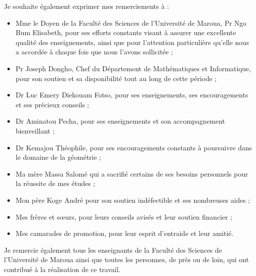 \documentclass[a4paper, 14pt]{report}
\newcommand{\applyfontsize}{%
	\fontsize{12}{12}\selectfont
}
\begin{document}
\begin{onehalfspace}
{			Je souhaite également exprimer mes remerciements à :
			\begin{itemize}
				\item Mme le Doyen de la Faculté des Sciences de l’Université de Maroua, Pr Ngo Bum Elisabeth, pour ses efforts constants visant à assurer une excellente qualité des enseignements, ainsi que pour l'attention particulière qu'elle nous a accordée à chaque fois que nous l'avons sollicitée ;
				\item Pr Joseph Dongho, Chef du Département de Mathématiques et Informatique, pour son soutien et sa disponibilité tout au long de cette période ;
				\item Dr Luc Emery Diekouam Fotso, pour ses enseignements, ses encouragements et ses précieux conseils ;
				\item Dr Aminatou Pecha, pour ses enseignements et son accompagnement bienveillant ;
				\item Dr Kemajou Théophile, pour ses encouragements constants à poursuivre dans le domaine de la géométrie ;
				\item Ma mère Massa Salomé qui a sacrifié certains de ses besoins personnels pour la réussite de mes études ;
				\item Mon père Koge André pour son soutien indéfectible et ses nombreuses aides ;
				\item Mes frères et sœurs, pour leurs conseils avisés et leur soutien financier ;
				\item Mes camarades de promotion, pour leur esprit d’entraide et leur amitié.
			\end{itemize}
			
			Je remercie également tous les enseignants de la Faculté des Sciences de l’Université de Maroua ainsi que toutes les personnes, de près ou de loin, qui ont contribué à la réalisation de ce travail.
			
			
		}
		
		{
			\applyfontsize %
			
			\tableofcontents
		}
		
		

\end{onehalfspace}
\end{document}
